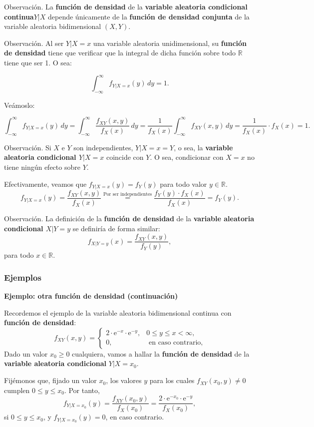 \documentclass[]{book}
\begin{document}
Observación.
La \textbf{función de densidad} de la \textbf{variable aleatoria condicional continua\(Y|X\)} depende únicamente de la \textbf{función de densidad conjunta} de la variable aleatoria bidimensional \((X,Y)\).

Observación.
Al ser \(Y|X=x\) una variable aleatoria unidimensional, su \textbf{función de densidad} tiene que verificar que la integral de dicha función sobre todo \(\mathbb{R}\) tiene que ser 1. O sea:

\[
\int_{-\infty}^\infty f_{Y|X=x}(y)\, dy=1.
\]

Veámoslo:

\[
\int_{-\infty}^\infty f_{Y|X=x}(y)\, dy =\int_{-\infty}^\infty \frac{f_{XY}(x,y)}{f_X(x)}\, dy=\frac{1}{f_X(x)}\int_{-\infty}^\infty f_{XY}(x,y)\, dy= \frac{1}{f_X(x)}\cdot f_X(x) =1.
\]

Observación.
Si \(X\) e \(Y\) son independientes, \(Y|X=x =Y\), o sea, la \textbf{variable aleatoria condicional \(Y|X=x\)} coincide con \(Y\). O sea, condicionar con \(X=x\) no tiene ningún efecto sobre \(Y\).

Efectivamente, veamos que \(f_{Y|X=x}(y)=f_Y(y)\) para todo valor \(y\in\mathbb{R}.\)
\[
f_{Y|X=x}(y) =\frac{f_{XY}(x,y)}{f_X(x)} \stackrel{\mbox{Por ser independientes}}{=}\frac{f_Y(y)\cdot f_X(x)}{f_X(x)}=f_Y(y).
\]

Observación.
La definición de la \textbf{función de densidad} de la \textbf{variable aleatoria condicional \(X|Y=y\)} se definiría de forma similar:
\[
f_{X|Y=y}(x)=\frac{f_{XY}(x,y)}{f_Y(y)},
\]
para todo \(x\in\mathbb{R}\).

\hypertarget{ejemplos-7}{%
\subsubsection{Ejemplos}\label{ejemplos-7}}

\textbf{Ejemplo: otra función de densidad (continuación)}

Recordemos el ejemplo de la variable aleatoria bidimensional continua con \textbf{función de densidad}:
\[
f_{XY}(x,y)=\begin{cases}
2 \cdot \mathrm{e}^{-x}\cdot \mathrm{e}^{-y}, & 0\leq y\leq x < \infty,\\
0, & \mbox{ en caso contrario,}
\end{cases}
\]
Dado un valor \(x_0\geq 0\) cualquiera, vamos a hallar la \textbf{función de densidad} de la \textbf{variable aleatoria condicional} \(Y|X=x_0\).

Fijémonos que, fijado un valor \(x_0\), los valores \(y\) para los cuales \(f_{XY}(x_0,y)\neq 0\) cumplen \(0\leq y\leq x_0\).
Por tanto,
\[
f_{Y|X=x_0}(y)=\frac{f_{XY}(x_0,y)}{f_X(x_0)}=\frac{2\cdot \mathrm{e}^{-x_0}\cdot \mathrm{e}^{-y}}{f_X(x_0)},
\]
si \(0\leq y\leq x_0\), y \(f_{Y|X=x_0}(y)=0\), en caso contrario.
\end{document}
